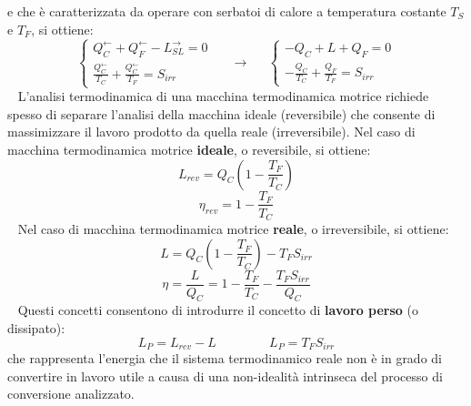 e che è caratterizzata da operare con serbatoi di calore a temperatura costante $T_S$ e $T_F$, si
ottiene: 
\[
    \begin{cases}
        Q_C^\leftarrow  + Q_F^\leftarrow  - L_{SL}^\rightarrow = 0\\
        \frac{Q_C^\leftarrow}{T_C} + \frac{Q_C^\leftarrow}{T_F} = S_{irr}
    \end{cases}\;\;\;\;\;\longrightarrow\;\;\;\;\;\begin{cases}
        -Q_C + L + Q_F = 0\\
        - \frac{Q_C}{T_C} + \frac{Q_F}{T_F} = S_{irr}
    \end{cases}
\]
\ \newline
L’analisi termodinamica di una macchina termodinamica motrice richiede spesso di separare
l’analisi della macchina ideale (reversibile) che consente di massimizzare il lavoro prodotto
da quella reale (irreversibile). \newline
Nel caso di macchina termodinamica motrice \textbf{ideale}, o reversibile, si ottiene: 
\[
    L_{rev} = Q_C \left(1- \frac{T_F}{T_C}\right)
\]
\[
    \eta_{rev} = 1- \frac{T_F}{T_C}
\]
\ \newline
Nel caso di macchina termodinamica motrice \textbf{reale}, o irreversibile, si ottiene:
\[
    L  = Q_C \left(1- \frac{T_F}{T_C}\right) - T_FS_{irr}
\]
\[
    \eta = \frac{L}{Q_C} = 1-\frac{T_F}{T_C} - \frac{T_F S_{irr}}{Q_C}
\]
\ \newline
Questi concetti consentono di introdurre il concetto di \textbf{lavoro perso} (o dissipato):
\[
    L_P = L_{rev} - L \;\;\;\;\;\;\;\;\;\;\;\;\;\;\;L_{P} = T_FS_{irr}
\]
che rappresenta l’energia che il sistema termodinamico reale non è in grado di convertire in
lavoro utile a causa di una non-idealità intrinseca del processo di conversione analizzato.
